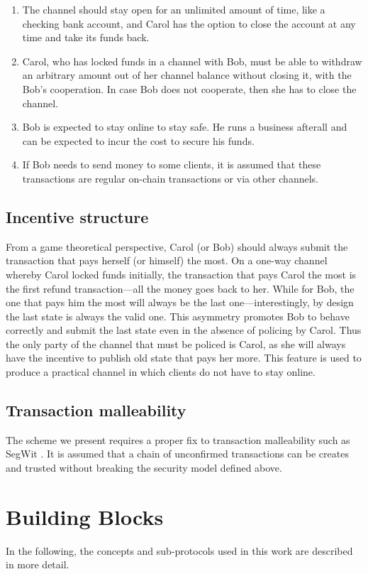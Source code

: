 \documentclass{llncs}
\begin{document}
\begin{enumerate}[label=(\roman*)]
\item The channel should stay open for an unlimited amount of time, like a
checking bank account, and Carol has the option to close the account at any time
and take its funds back.
\item Carol, who has locked funds in a channel with Bob, must be able to
withdraw an arbitrary amount out of her channel balance without closing it, with
the Bob's cooperation. In case Bob does not cooperate, then she has to close the
channel.
\item Bob is expected to stay online to stay safe. He runs a business afterall
and can be expected to incur the cost to secure his funds.
\item If Bob needs to send money to some clients, it is assumed that these
transactions are regular on-chain transactions or via other channels.
\end{enumerate}

\subsection{Incentive structure} From a game theoretical perspective, Carol (or
Bob) should always submit the transaction that pays herself (or himself) the
most. On a one-way channel whereby Carol locked funds initially, the transaction
that pays Carol the most is the first refund transaction---all the money goes
back to her. While for Bob, the one that pays him the most will always be the
last one---interestingly, by design the last state is always the valid one. This
asymmetry promotes Bob to behave correctly and submit the last state even in the
absence of policing by Carol. Thus the only party of the channel that must be
policed is Carol, as she will always have the incentive to publish old state
that pays her more. This feature is used to produce a practical channel in which
clients do not have to stay online.

\subsection{Transaction malleability} The scheme we present requires a proper
fix to transaction malleability such as SegWit \cite{SegWit, SegWitBIP}.
It is assumed that a chain of unconfirmed transactions can be creates and
trusted without breaking the security model defined above.

\section{Building Blocks} In the following, the concepts and sub-protocols used
in this work are described in more detail.
\end{document}
